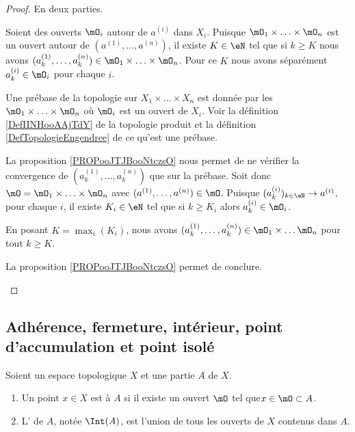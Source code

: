 \begin{proof}
	En deux parties.
	\begin{subproof}
		Soient des ouverts \( \mO_i\) autour de \( a^{(i)}\) dans \( X_i\). Puisque \( \mO_1\times \ldots\times \mO_n\) est un ouvert autour de \( (a^{(1)},\ldots, a^{(n)})\), il existe \( K\in \eN\) tel que si \( k\geq K\) nous avons \( (a^{(1)}_k,\ldots, a^{(n)}_k)\in \mO_1\times \ldots \times \mO_n\). Pour ce \( K\) nous avons séparément \( a^{(i)}_k\in \mO_i\) pour chaque \( i\).

		Une prébase de la topologie sur \( X_1\times \ldots\times X_n\) est donnée par les \( \mO_1\times \ldots \times \mO_n\) où \( \mO_i\) est un ouvert de \( X_i\). Voir la définition \ref{DefIINHooAAjTdY} de la topologie produit et la définition \ref{DefTopologieEngendree} de ce qu'est une prébase.

		La proposition \ref{PROPooJTJBooNtczsO} nous permet de ne vérifier la convergence de \( (a^{(1)}_k,\ldots, a^{(n)}_k)\) que sur la prébase. Soit donc \(\mO= \mO_1\times \ldots \times \mO_n\) avec \( (a^{(1)},\ldots, a^{(n)})\in \mO\). Puisque \( (a^{(i)}_k)_{k\in \eN}\to a^{(i)}\), pour chaque \( i\), il existe \( K_i\in \eN\) tel que si \( k\geq K_i\) alors \( a^{(i)}_k\in \mO_i\).

		En posant \( K=\max_i(K_i)\), nous avons \( (a^{(1)}_k,\ldots, a^{(n)}_k)\in \mO_1\times \ldots \mO_n\) pour tout \( k\geq K\).

		La proposition \ref{PROPooJTJBooNtczsO} permet de conclure.
	\end{subproof}
\end{proof}


\subsection{Adhérence, fermeture, intérieur, point d'accumulation et point isolé}

\begin{definition}      \label{DEFooSVWMooLpAVZRInt}
	Soient un espace topologique \( X\) et une partie \( A\) de \( X\).
	\begin{enumerate}
		\item
		      Un point \( x\in X\) est  à \( A\) si il existe un ouvert \( \mO\) tel que\( x\in \mO\subset A\).
		\item
		      L' de \( A\), notée \( \Int(A)\), est l'union de tous les ouverts de \( X\) contenus dans \( A\).
	\end{enumerate}
\end{definition}

